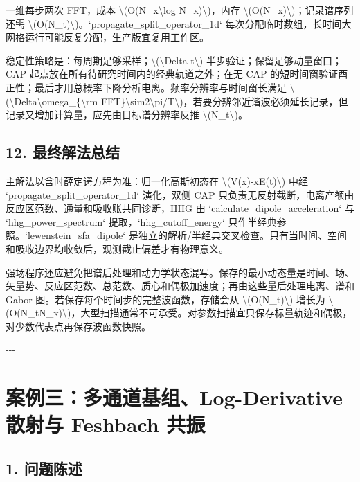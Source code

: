 \documentclass[UTF8,openany,11pt,fontset=fandol]{ctexbook}
\begin{document}
一维每步两次 FFT，成本 \textbackslash(O(N\_x\textbackslash log
N\_x)\textbackslash)，内存
\textbackslash(O(N\_x)\textbackslash)；记录谱序列还需
\textbackslash(O(N\_t)\textbackslash)。`propagate\_split\_operator\_1d`
每次分配临时数组，长时间大网格运行可能反复分配，生产版宜复用工作区。

稳定性策略是：每周期足够采样；\textbackslash(\textbackslash Delta
t\textbackslash) 半步验证；保留足够动量窗口；CAP
起点放在所有待研究时间内的经典轨道之外；在无 CAP
的短时间窗验证酉正性；最后才用总概率下降分析电离。频率分辨率与时间窗长满足
\textbackslash(\textbackslash Delta\textbackslash omega\_\{\textbackslash rm
FFT\}\textbackslash sim2\textbackslash pi/T\textbackslash)，若要分辨邻近谐波必须延长记录，但记录又增加计算量，应先由目标谱分辨率反推
\textbackslash(N\_t\textbackslash)。

\subsection{\texorpdfstring{\textbf{12.
最终解法总结}}{12. 最终解法总结}}\label{ux6700ux7ec8ux89e3ux6cd5ux603bux7ed3-1}

主解法以含时薛定谔方程为准：归一化高斯初态在
\textbackslash(V(x)-xE(t)\textbackslash) 中经
`propagate\_split\_operator\_1d` 演化，双侧 CAP
只负责无反射截断，电离产额由反应区范数、通量和吸收账共同诊断，HHG 由
`calculate\_dipole\_acceleration` 与 `hhg\_power\_spectrum`
提取，`hhg\_cutoff\_energy` 只作半经典参照。`lewenstein\_sfa\_dipole`
是独立的解析/半经典交叉检查。只有当时间、空间和吸收边界均收敛后，观测截止偏差才有物理意义。

强场程序还应避免把谱后处理和动力学状态混写。保存的最小动态量是时间、场、矢量势、反应区范数、总范数、质心和偶极加速度；再由这些量后处理电离、谱和
Gabor 图。若保存每个时间步的完整波函数，存储会从
\textbackslash(O(N\_t)\textbackslash) 增长为
\textbackslash(O(N\_tN\_x)\textbackslash)，大型扫描通常不可承受。对参数扫描宜只保存标量轨迹和偶极，对少数代表点再保存波函数快照。

-\/-\/-

\section{\texorpdfstring{\textbf{案例三：多通道基组、Log-Derivative
散射与 Feshbach
共振}}{案例三：多通道基组、Log-Derivative 散射与 Feshbach 共振}}\label{ux6848ux4f8bux4e09ux591aux901aux9053ux57faux7ec4log-derivative-ux6563ux5c04ux4e0e-feshbach-ux5171ux632f}

\subsection{\texorpdfstring{\textbf{1.
问题陈述}}{1. 问题陈述}}\label{ux95eeux9898ux9648ux8ff0-2}
\end{document}
